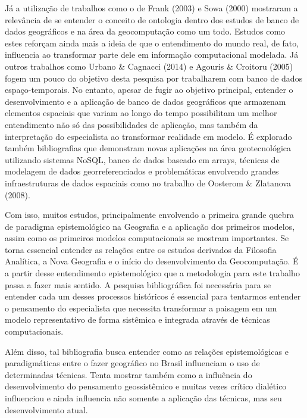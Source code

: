 Já a utilização de trabalhos como o de Frank (2003) e Sowa (2000) mostraram a relevância de se entender o conceito de ontologia dentro dos estudos de banco de dados geográficos e na área da geocomputação como um todo. Estudos como estes reforçam ainda mais a ideia de que o entendimento do mundo real, de fato, influencia ao transformar parte dele em informação computacional modelada. Já outros trabalhos como Urbano \& Cagnacci (2014) e Agouris \& Croitoru (2005) fogem um pouco do objetivo desta pesquisa por trabalharem com banco de dados espaço-temporais. No entanto, apesar de fugir ao objetivo principal, entender o desenvolvimento e a aplicação de banco de dados geográficos que armazenam elementos espaciais que variam ao longo do tempo possibilitam um melhor entendimento não só das possibilidades de aplicação, mas também da interpretação do especialista ao transformar realidade em modelo. É explorado também bibliografias que demonstram novas aplicações na área geotecnológica utilizando sistemas NoSQL, banco de dados baseado em arrays, técnicas de modelagem de dados georreferenciados e problemáticas envolvendo grandes infraestruturas de dados espaciais como no trabalho de Oosterom \& Zlatanova (2008). 

Com isso, muitos estudos, principalmente envolvendo a primeira grande quebra de paradigma epistemológico na Geografia e a aplicação dos primeiros modelos, assim como os primeiros modelos computacionais se mostram importantes. Se torna essencial entender as relações entre os estudos derivados da Filosofia Analítica, a Nova Geografia e o início do desenvolvimento da Geocomputação. É a partir desse entendimento epistemológico que a metodologia para este trabalho passa a fazer mais sentido. A pesquisa bibliográfica foi necessária para se entender cada um desses processos históricos é essencial para tentarmos entender o pensamento do especialista que necessita transformar a paisagem em um modelo representativo de forma sistêmica e integrada através de técnicas computacionais. 

Além disso, tal bibliografia busca entender como as relações epistemológicas e paradigmáticas entre o fazer geográfico no Brasil influenciam o uso de determinadas técnicas. Tenta mostrar também como a influência do desenvolvimento do pensamento geossistêmico e muitas vezes crítico dialético influenciou e ainda influencia não somente a aplicação das técnicas, mas seu desenvolvimento atual. 

